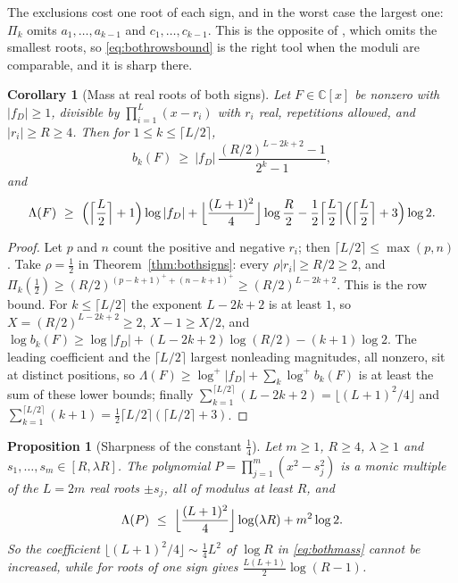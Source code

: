 \documentclass[11pt]{article}
\newtheorem{corollary}[theorem]{Corollary}
\newtheorem{proposition}[theorem]{Proposition}
\begin{document}
The exclusions cost one root of each sign, and in the worst case the largest
one: $\Pi_k$ omits $a_1,\ldots,a_{k-1}$ and $c_1,\ldots,c_{k-1}$.  This is the
opposite of \cite[Theorem~3.2]{coefficient-mass}, which omits the smallest roots, so
\eqref{eq:bothrowsbound} is the right tool when the moduli are comparable, and
it is sharp there.

\begin{corollary}[Mass at real roots of both signs]\label{cor:bothsignsmass}
Let $F\in\mathbb C[x]$ be nonzero with $|f_D|\ge1$, divisible by
$\prod_{i=1}^L(x-r_i)$ with $r_i$ real, repetitions allowed, and $|r_i|\ge R\ge4$.
Then for $1\le k\le\lceil L/2\rceil$,
\[
  b_k(F)\ \ge\ |f_D|\,\frac{(R/2)^{L-2k+2}-1}{2^k-1},
\]
and
\begin{equation}\label{eq:bothmass}
  \Lambda(F)\ \ge\ \Bigl(\Bigl\lceil\frac L2\Bigr\rceil+1\Bigr)\log|f_D|
  +\Bigl\lfloor\frac{(L+1)^2}4\Bigr\rfloor\log\frac R2
  -\frac12\Bigl\lceil\frac L2\Bigr\rceil\Bigl(\Bigl\lceil\frac L2\Bigr\rceil+3\Bigr)\log2 .
\end{equation}
\end{corollary}

\begin{proof}
Let $p$ and $n$ count the positive and negative $r_i$; then
$\lceil L/2\rceil\le\max(p,n)$.  Take $\rho=\frac12$ in
Theorem~\ref{thm:bothsigns}: every $\rho|r_i|\ge R/2\ge2$, and
$\Pi_k(\tfrac12)\ge(R/2)^{(p-k+1)^++(n-k+1)^+}\ge(R/2)^{L-2k+2}$.  This is the row
bound.  For $k\le\lceil L/2\rceil$ the exponent $L-2k+2$ is at least $1$, so
$X=(R/2)^{L-2k+2}\ge2$, $X-1\ge X/2$, and
$\log b_k(F)\ge\log|f_D|+(L-2k+2)\log(R/2)-(k+1)\log2$.  The leading coefficient
and the $\lceil L/2\rceil$ largest nonleading magnitudes, all nonzero, sit at
distinct positions, so $\Lambda(F)\ge\log^+|f_D|+\sum_k\log^+b_k(F)$ is at
least the sum of these lower bounds; finally
$\sum_{k=1}^{\lceil L/2\rceil}(L-2k+2)=\lfloor(L+1)^2/4\rfloor$ and
$\sum_{k=1}^{\lceil L/2\rceil}(k+1)=\frac12\lceil L/2\rceil(\lceil L/2\rceil+3)$.
\end{proof}

\begin{proposition}[Sharpness of the constant $\frac14$]\label{prop:bothsignssharp}
Let $m\ge1$, $R\ge4$, $\lambda\ge1$ and $s_1,\ldots,s_m\in[R,\lambda R]$.  The
polynomial $P=\prod_{j=1}^m(x^2-s_j^2)$ is a monic multiple of the $L=2m$ real
roots $\pm s_j$, all of modulus at least $R$, and
\[
  \Lambda(P)\ \le\ \Bigl\lfloor\frac{(L+1)^2}4\Bigr\rfloor\log(\lambda R)+m^2\log2 .
\]
So the coefficient $\lfloor(L+1)^2/4\rfloor\sim\frac14L^2$ of $\log R$ in
\eqref{eq:bothmass} cannot be increased, while for roots of one sign
\cite[Corollary~3.4]{coefficient-mass} gives $\frac{L(L+1)}2\log(R-1)$.
\end{proposition}
\end{document}
